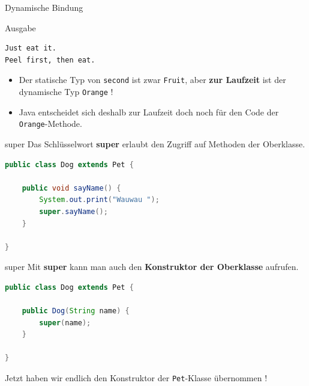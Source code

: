 \documentclass[18pt]{beamer}
\begin{document}
\begin{frame}[fragile]{Dynamische Bindung}
    \begin{exampleblock}{Ausgabe}
        \begin{lstlisting}
Just eat it.
Peel first, then eat.
        \end{lstlisting}
    \end{exampleblock}

    \begin{itemize}
        \item Der statische Typ von \texttt{second} ist zwar \texttt{Fruit}, aber \textbf{zur Laufzeit} ist der \alert{dynamische Typ} \texttt{Orange} !
        \item Java entscheidet sich deshalb zur Laufzeit doch noch für den Code der \texttt{Orange}-Methode.
    \end{itemize}

\end{frame}



\begin{frame}[fragile]{super}
    Das Schlüsselwort \textbf{super} erlaubt den Zugriff auf Methoden der Oberklasse.

    \begin{exampleblock}{}
        \begin{lstlisting}[language=Java]
public class Dog extends Pet {

    public void sayName() {
        System.out.print("Wauwau ");
        super.sayName();
    }

}
        \end{lstlisting}

    \end{exampleblock}

\end{frame}

\begin{frame}[fragile]{super}
    Mit \textbf{super} kann man auch den \textbf{Konstruktor der Oberklasse} aufrufen.

    \begin{exampleblock}{}
        \begin{lstlisting}[language=Java]
public class Dog extends Pet {

    public Dog(String name) {
        super(name);
    }

}
        \end{lstlisting}

    \end{exampleblock}
    \vspace{.2in}
    Jetzt haben wir endlich den Konstruktor der \texttt{Pet}-Klasse übernommen !
\end{frame}
\end{document}
